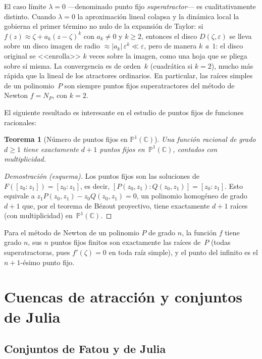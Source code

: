 \documentclass[11pt,a4paper]{article}
\theoremstyle{plain}
\newtheorem{teorema}{Teorema}[section]
\theoremstyle{definition}
\theoremstyle{remark}
\newcommand{\Puno}{\mathbb{P}^1(\mathbb{C})}
\begin{document}
El caso límite $\lambda=0$ —denominado punto fijo \emph{superatractor}— es cualitativamente distinto.
Cuando $\lambda=0$ la aproximación lineal colapsa y la dinámica local
la gobierna el primer término no nulo de la expansión de Taylor:
si $f(z)\approx\zeta+a_k(z-\zeta)^k$ con $a_k\neq 0$ y $k\geq 2$,
entonces el disco $D(\zeta,\varepsilon)$ se lleva sobre un disco imagen de
radio $\approx|a_k|\,\varepsilon^k\ll\varepsilon$, pero de manera \emph{$k$ a~$1$}:
el disco original se <<enrolla>> $k$ veces sobre la imagen,
como una hoja que se pliega sobre sí misma.
La convergencia es de orden~$k$ (cuadrática si $k=2$), mucho más rápida
que la lineal de los atractores ordinarios.
En particular, las raíces simples de un polinomio~$P$ son siempre puntos
fijos superatractores del método de Newton $f=N_P$, con $k=2$.



El siguiente resultado es interesante en el estudio de puntos fijos de funciones racionales:

\begin{teorema}[Número  de puntos fijos en $\Puno$]
\label{teo:puntosfijos}
Una función racional de grado $d\geq 1$ tiene exactamente $d+1$
puntos fijos en~$\Puno$, contados con multiplicidad.
\end{teorema}

\begin{proof}[Demostración (esquema)]
Los puntos fijos son las soluciones de $F([z_0:z_1])=[z_0:z_1]$,
es decir, $[P(z_0,z_1):Q(z_0,z_1)]=[z_0:z_1]$.
Esto equivale a $z_1 P(z_0,z_1)-z_0 Q(z_0,z_1)=0$, un polinomio
homogéneo de grado $d+1$ que, por el teorema de Bézout proyectivo, 
tiene exactamente $d+1$ raíces (con multiplicidad) en~$\Puno$.
\end{proof}

Para el método de Newton de un polinomio $P$ de grado $n$, la función
$f$ tiene grado $n$, sus $n$ puntos fijos finitos son exactamente
las raíces de~$P$ (todas superatractoras, pues $f'(\zeta)=0$ en toda
raíz simple), y el punto del infinito es el $n+1$-ésimo punto fijo.

\section{Cuencas de atracción y conjuntos de Julia}
\label{sec:cuencas}

\subsection{Conjuntos de Fatou y de Julia}
\label{ssec:julia}
\end{document}
